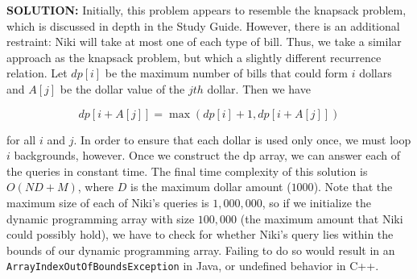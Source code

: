 \textbf{SOLUTION:}
\blank
Initially, this problem appears to resemble the knapsack problem, which is discussed in depth in the Study Guide. However, there is an additional restraint: Niki will take at most one of each type of bill. Thus, we take a similar approach as the knapsack problem, but which a slightly different recurrence relation. 
\blank
Let $dp[i]$ be the maximum number of bills that could form $i$ dollars and $A[j]$ be the dollar value of the $jth$ dollar. Then we have

$$dp[i+A[j]] = \max (dp[i]+1, dp[i+A[j]])$$

for all $i$ and $j$. In order to ensure that each dollar is used only once, we must loop $i$ backgrounds, however. 
\blank
Once we construct the dp array, we can answer each of the queries in constant time. The final time complexity of this solution is $O(ND+M)$, where $D$ is the maximum dollar amount ($1000$). 
\blank
Note that the maximum size of each of Niki's queries is $1,000,000$, so if we initialize the dynamic programming array with size $100,000$ (the maximum amount that Niki could possibly hold), we have to check for whether Niki's query lies within the bounds of our dynamic programming array. Failing to do so would result in an \verb|ArrayIndexOutOfBoundsException| in Java, or undefined behavior in C++.  